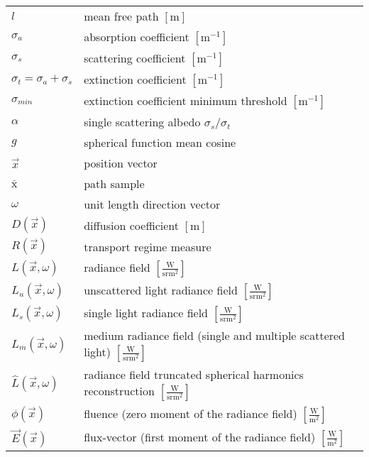 \begin{flushleft}
\renewcommand*{\arraystretch}{1.75}
\begin{longtable}[c]{@{}p{28.5mm}@{} p{120.5mm}}
	$l$	&  mean free path $\left[\si{\meter}\right]$\\
	$\sigma_a$	&  absorption coefficient $\left[\si{\meter}^{-1}\right]$
	\\
	$\sigma_s$	&  scattering coefficient $\left[\si{\meter}^{-1}\right]$
	\\
	$\sigma_t=\sigma_a+\sigma_s$	&  extinction coefficient $\left[\si{\meter}^{-1}\right]$
	\\
	$\sigma_{min}$	&  extinction coefficient minimum threshold $\left[\si{\meter}^{-1}\right]$
	\\
	$\alpha$	&  single scattering albedo $\sigma_s/\sigma_t$
	\\
	$g$	&  spherical function mean cosine
	\\
	$\vec{x}$	&  position vector
	\\
	$\bar{\mathrm{x}}$	&  path sample
	\\
	$\omega$	&  unit length direction vector
	\\
	$D\left(\vec{x}\right)$	&  diffusion coefficient $\left[\si{\meter}\right]$
	\\
	$R\left(\vec{x}\right)$	&  transport regime measure
	\\
	$L\left(\vec{x}, \omega\right)$	&  radiance field $\left[\frac{\si{\watt}}{\si{\steradian} \si{\meter}^2}\right]$
	\\
	$L_u\left(\vec{x}, \omega\right)$	&  unscattered light radiance field $\left[\frac{\si{\watt}}{\si{\steradian} \si{\meter}^2}\right]$
	\\
	$L_s\left(\vec{x}, \omega\right)$	&  single light radiance field $\left[\frac{\si{\watt}}{\si{\steradian} \si{\meter}^2}\right]$
	\\
	$L_m\left(\vec{x}, \omega\right)$	&  medium radiance field (single and multiple scattered light) $\left[\frac{\si{\watt}}{\si{\steradian} \si{\meter}^2}\right]$
	\\
	$\widehat{L}\left(\vec{x}, \omega\right)$	&  radiance field truncated spherical harmonics reconstruction $\left[\frac{\si{\watt}}{\si{\steradian} \si{\meter}^2}\right]$
	\\
	$\phi\left(\vec{x}\right)$	&  fluence (zero moment of the radiance field) $\left[\frac{\si{\watt}}{\si{\meter}^2}\right]$
	\\
	$\vec{E}\left(\vec{x}\right)$	&  flux-vector (first moment of the radiance field) $\left[\frac{\si{\watt}}{\si{\meter}^2}\right]$

\end{longtable}
\end{flushleft}
